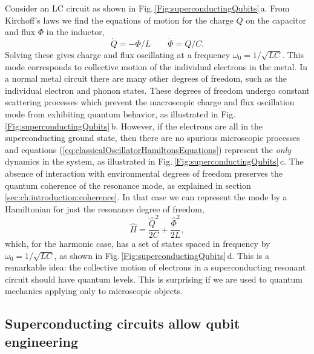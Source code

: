 Consider an LC circuit as shown in Fig.\,\ref{Fig:superconductingQubits}\,a.
From Kirchoff's laws we find the equations of motion for the charge $Q$ on the capacitor and flux $\Phi$ in the inductor, \begin{equation}
\dot{Q} = - \Phi/L \qquad \dot{\Phi} = Q/C . \label{eq:classicalOscillatorHamiltonsEquations} \end{equation}
Solving these gives charge and flux oscillating at a frequency $\omega_0 = 1/\sqrt{LC}$.
This mode corresponds to collective motion of the individual electrons in the metal.
In a normal metal circuit there are many other degrees of freedom, such as the individual electron and phonon states.
These degrees of freedom undergo constant scattering processes which prevent the macroscopic charge and flux oscillation mode from exhibiting quantum behavior, as illustrated in Fig.\,\ref{Fig:superconductingQubits}\,b.
However, if the electrons are all in the superconducting ground state, then there are no spurious microscopic processes and equations (\ref{eq:classicalOscillatorHamiltonsEquations}) represent the \emph{only} dynamics in the system, as illustrated in Fig.\,\ref{Fig:superconductingQubits}\,c.
The absence of interaction with environmental degrees of freedom preserves the quantum coherence of the resonance mode, as explained in section \ref{sec:ch:introduction:coherence}.
In that case we can represent the mode by a Hamiltonian for just the resonance degree of freedom, \begin{equation}
\hat{H} = \frac{\hat{Q}^2}{2C} + \frac{\hat{\Phi}^2}{2L} , \end{equation}
which, for the harmonic case, has a set of states spaced in frequency by $\omega_0=1/\sqrt{LC}$, as shown in Fig.\,\ref{Fig:superconductingQubits}\,d.
This is a remarkable idea: the collective motion of electrons in a superconducting resonant circuit should have quantum levels.
This is surprising if we are used to quantum mechanics applying only to microscopic objects.

\subsection{Superconducting circuits allow qubit engineering}


